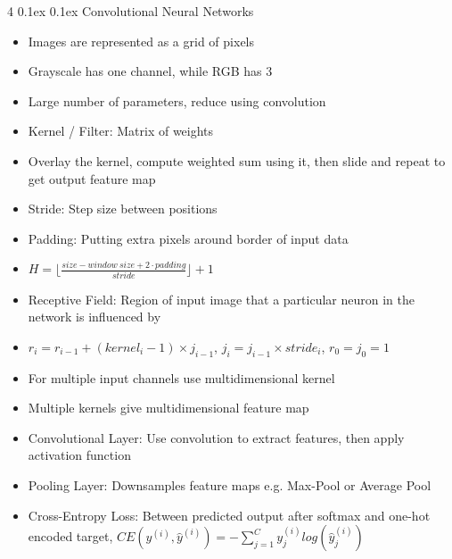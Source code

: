 \documentclass[10pt, landscape]{article}
\makeatletter
\renewcommand{\section}{\@startsection{section}{1}{0mm}%
  {0.1ex} %
  {0.1ex} %
  {\normalfont\large\bfseries}}
\makeatother
\begin{document}
\begin{multicols*}{4}
\section{Convolutional Neural Networks}
\begin{itemize}
    \item Images are represented as a grid of pixels
    \item Grayscale has one channel, while RGB has 3
    \item Large number of parameters, reduce using convolution
    \item Kernel / Filter: Matrix of weights
    \item Overlay the kernel, compute weighted sum using it, then slide and repeat to get output feature map
    \item Stride: Step size between positions
    \item Padding: Putting extra pixels around border of input data
    \item $H=\lfloor\frac{size - window\ size + 2\cdot padding}{stride} \rfloor + 1$
    \item Receptive Field: Region of input image that a particular neuron in the network is influenced by
    \item $r_i=r_{i-1}+(kernel_i-1) \times j_{i-1}$, $j_i = j_{i-1} \times stride_i$, $r_0=j_0=1$
    \item For multiple input channels use multidimensional kernel
    \item Multiple kernels give multidimensional feature map
    \item Convolutional Layer: Use convolution to extract features, then apply activation function
    \item Pooling Layer: Downsamples feature maps e.g. Max-Pool or Average Pool
    \item Cross-Entropy Loss: Between predicted output after softmax and one-hot encoded target, $CE(y^{(i)}, \hat{y}^{(i)})=-\sum_{j=1}^Cy_j^{(i)}log(\hat{y}_j^{(i)})$
\end{itemize}


\end{multicols*}
\end{document}
